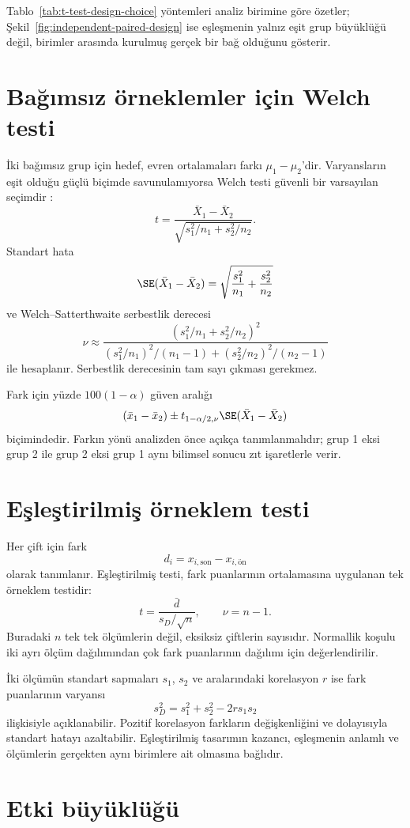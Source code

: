 Tablo~\ref{tab:t-test-design-choice} yöntemleri analiz birimine göre özetler;
Şekil~\ref{fig:independent-paired-design} ise eşleşmenin yalnız eşit grup
büyüklüğü değil, birimler arasında kurulmuş gerçek bir bağ olduğunu gösterir.

\section{Bağımsız örneklemler için Welch \tstat testi}
\label{sec:welch-test}

İki bağımsız grup için hedef, evren ortalamaları farkı
$\mu_1-\mu_2$'dir. Varyansların eşit olduğu güçlü biçimde savunulamıyorsa
Welch testi güvenli bir varsayılan seçimdir \citep{delacre2017}:
\[
t=\frac{\bar X_1-\bar X_2}
{\sqrt{s_1^2/n_1+s_2^2/n_2}}.
\]
Standart hata
\[
\SE(\bar X_1-\bar X_2)
=\sqrt{\frac{s_1^2}{n_1}+\frac{s_2^2}{n_2}}
\]
ve Welch--Satterthwaite serbestlik derecesi
\[
\nu\approx
\frac{(s_1^2/n_1+s_2^2/n_2)^2}
{(s_1^2/n_1)^2/(n_1-1)+(s_2^2/n_2)^2/(n_2-1)}
\]
ile hesaplanır. Serbestlik derecesinin tam sayı çıkması gerekmez.

Fark için yüzde $100(1-\alpha)$ güven aralığı
\[
(\bar x_1-\bar x_2)
\pm t_{1-\alpha/2,\nu}
\SE(\bar X_1-\bar X_2)
\]
biçimindedir. Farkın yönü analizden önce açıkça tanımlanmalıdır; grup 1 eksi
grup 2 ile grup 2 eksi grup 1 aynı bilimsel sonucu zıt işaretlerle verir.

\section{Eşleştirilmiş örneklem \tstat testi}
\label{sec:paired-test}

Her çift için fark
\[
d_i=x_{i,\text{son}}-x_{i,\text{ön}}
\]
olarak tanımlanır. Eşleştirilmiş \tstat testi, fark puanlarının ortalamasına
uygulanan tek örneklem \tstat testidir:
\[
t=\frac{\bar d}{s_D/\sqrt n},
\qquad \nu=n-1.
\]
Buradaki $n$ tek tek ölçümlerin değil, eksiksiz çiftlerin sayısıdır.
Normallik koşulu iki ayrı ölçüm dağılımından çok fark puanlarının dağılımı
için değerlendirilir.

İki ölçümün standart sapmaları $s_1$, $s_2$ ve aralarındaki korelasyon $r$
ise fark puanlarının varyansı
\[
s_D^2=s_1^2+s_2^2-2rs_1s_2
\]
ilişkisiyle açıklanabilir. Pozitif korelasyon farkların değişkenliğini ve
dolayısıyla standart hatayı azaltabilir. Eşleştirilmiş tasarımın kazancı,
eşleşmenin anlamlı ve ölçümlerin gerçekten aynı birimlere ait olmasına
bağlıdır.

\section{Etki büyüklüğü}
\label{sec:t-effect-size}

